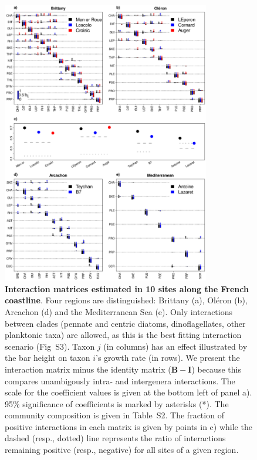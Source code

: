 \documentclass[10pt]{article}
\begin{document}
\begin{figure}[!ht]
\centering
 \includegraphics[width=0.81\textwidth]{biotic_interaction_matrices_MainFig_allin1_v4}
\caption{\textbf{Interaction matrices estimated in 10 sites along the French
coastline}. Four regions are distinguished: Brittany (a), Oléron (b),
Arcachon (d) and the Mediterranean Sea (e). Only interactions between
clades (pennate and centric diatoms, dinoflagellates, other planktonic
taxa) are allowed, as this is the best fitting interaction scenario
(Fig~S3). Taxon $j$ (in columns) has an effect illustrated
by the bar height on taxon $i$'s growth rate (in rows). We present
the interaction matrix minus the identity matrix ($\mathbf{B}-\mathbf{I}$)
because this compares unambigously intra- and intergenera interactions.
The scale for the coefficient values is given at the bottom left of
panel a). 95\% significance of coefficients is marked by asterisks
({*}). The community composition is given in Table~S2.
The fraction of positive interactions in each matrix is given by points
in c) while the dashed (resp., dotted) line represents the ratio of
interactions remaining positive (resp., negative) for all sites of
a given region.}
\label{fig:Interaction-matrices}
\end{figure}
\end{document}
